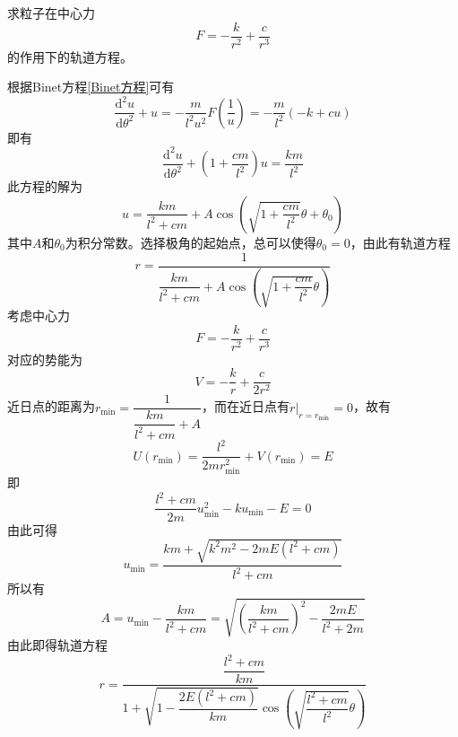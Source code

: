 \begin{question}
\label{理论力学：题3.6}
求粒子在中心力
\begin{equation*}
	F = -\frac{k}{r^2}+\frac{c}{r^3}
\end{equation*}
的作用下的轨道方程。
\end{question}
\begin{solution}
根据Binet方程\eqref{Binet方程}可有
\begin{equation*}
	\frac{\mathrm{d}^2 u}{\mathrm{d} \theta^2} + u = -\frac{m}{l^2 u^2} F\left(\frac{1}{u}\right) = -\frac{m}{l^2}(-k+cu)
\end{equation*}
即有
\begin{equation*}
	\frac{\mathrm{d}^2 u}{\mathrm{d} \theta^2} + \left(1+\frac{cm}{l^2}\right) u = \frac{km}{l^2}
\end{equation*}
此方程的解为
\begin{equation*}
	u = \frac{km}{l^2+cm} + A\cos \left(\sqrt{1+\frac{cm}{l^2}} \theta + \theta_0\right)
\end{equation*}
其中$A$和$\theta_0$为积分常数。选择极角的起始点，总可以使得$\theta_0=0$，由此有轨道方程
\begin{equation*}
	r = \frac{1}{\dfrac{km}{l^2+cm} + A\cos \left(\sqrt{1+\dfrac{cm}{l^2}} \theta\right)}
\end{equation*}
考虑中心力
\begin{equation*}
	F = -\frac{k}{r^2}+\frac{c}{r^3}
\end{equation*}
对应的势能为
\begin{equation*}
	V = -\frac{k}{r} + \frac{c}{2r^2}
\end{equation*}
近日点的距离为$r_{\min} = \dfrac{1}{\dfrac{km}{l^2+cm} + A}$，而在近日点有$\dot{r}\big|_{r=r_{\min}} = 0$，故有
\begin{equation*}
	U(r_{\min}) = \frac{l^2}{2m r_{\min}^2} + V(r_{\min}) = E
\end{equation*}
即
\begin{equation*}
	\frac{l^2+cm}{2m} u_{\min}^2 - ku_{\min} - E = 0
\end{equation*}
由此可得
\begin{equation*}
	u_{\min} = \frac{km+\sqrt{k^2m^2-2mE(l^2+cm)}}{l^2+cm}
\end{equation*}
所以有
\begin{equation*}
	A = u_{\min} - \frac{km}{l^2+cm} = \sqrt{\left(\frac{km}{l^2+cm}\right)^2 - \frac{2mE}{l^2+2m}}
\end{equation*}
由此即得轨道方程
\begin{equation*}
	r = \frac{\dfrac{l^2+cm}{km}}{1 + \sqrt{1-\dfrac{2E(l^2+cm)}{km}}\cos \left(\sqrt{\dfrac{l^2+cm}{l^2}} \theta\right)}
\end{equation*}
\end{solution}

